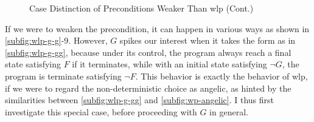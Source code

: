 \begin{figure}[ht!]\centering
	\ContinuedFloat
	\hfill

	\hfill
\caption{Case Distinction of Preconditions Weaker Than wlp (Cont.) }
\label{fig:wlp-g-2}
\end{figure}
If we were to weaken the precondition, it can happen in various ways as shown in \autoref{subfig:wlp-g-g}{\color{RoyalBlue}-9}. 
However, $G$ spikes our interest when it takes the form as in \autoref{subfig:wlp-g-gg}, because under its control, the program always  reach a final state satisfying $F$ if it terminates, while with an initial state satisfying $\neg G$, the program is  terminate satisfying $\neg F$. 
This behavior is exactly the behavior of wlp, if we were to regard the non-deterministic choice as angelic, as hinted by the similarities between \autoref{subfig:wlp-g-gg} and \autoref{subfig:wp-angelic}. 
I thus first investigate this special case, before proceeding with $G$ in general. 

